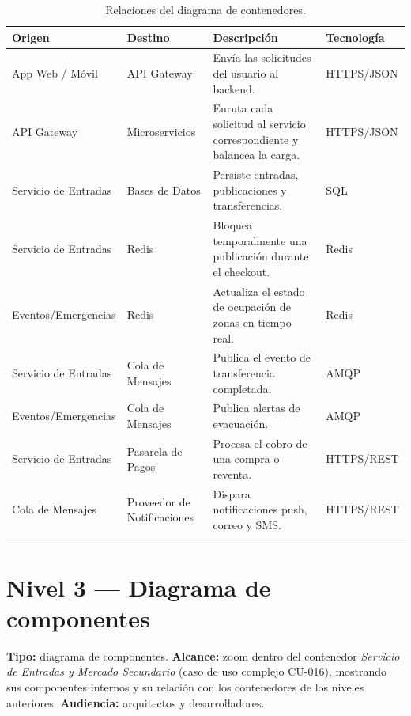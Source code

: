 \documentclass[12pt,a4paper]{article}
\begin{document}
\begin{longtable}{p{3.2cm}p{3.2cm}p{5.7cm}p{2.3cm}}
\toprule
\textbf{Origen} & \textbf{Destino} & \textbf{Descripción} & \textbf{Tecnología}\\
\midrule
App Web / Móvil & API Gateway & Envía las solicitudes del usuario al backend. & HTTPS/JSON\\
API Gateway & Microservicios & Enruta cada solicitud al servicio correspondiente y balancea la carga. & HTTPS/JSON\\
Servicio de Entradas & Bases de Datos & Persiste entradas, publicaciones y transferencias. & SQL\\
Servicio de Entradas & Redis & Bloquea temporalmente una publicación durante el checkout. & Redis\\
Eventos/Emergencias & Redis & Actualiza el estado de ocupación de zonas en tiempo real. & Redis\\
Servicio de Entradas & Cola de Mensajes & Publica el evento de transferencia completada. & AMQP\\
Eventos/Emergencias & Cola de Mensajes & Publica alertas de evacuación. & AMQP\\
Servicio de Entradas & Pasarela de Pagos & Procesa el cobro de una compra o reventa. & HTTPS/REST\\
Cola de Mensajes & Proveedor de Notificaciones & Dispara notificaciones push, correo y SMS. & HTTPS/REST\\
\bottomrule
\caption{Relaciones del diagrama de contenedores.}
\end{longtable}

\section{Nivel 3 — Diagrama de componentes}

\textbf{Tipo:} diagrama de componentes. \textbf{Alcance:} zoom dentro del contenedor
\textit{Servicio de Entradas y Mercado Secundario} (caso de uso complejo CU-016), mostrando sus
componentes internos y su relación con los contenedores de los niveles anteriores.
\textbf{Audiencia:} arquitectos y desarrolladores.
\end{document}
